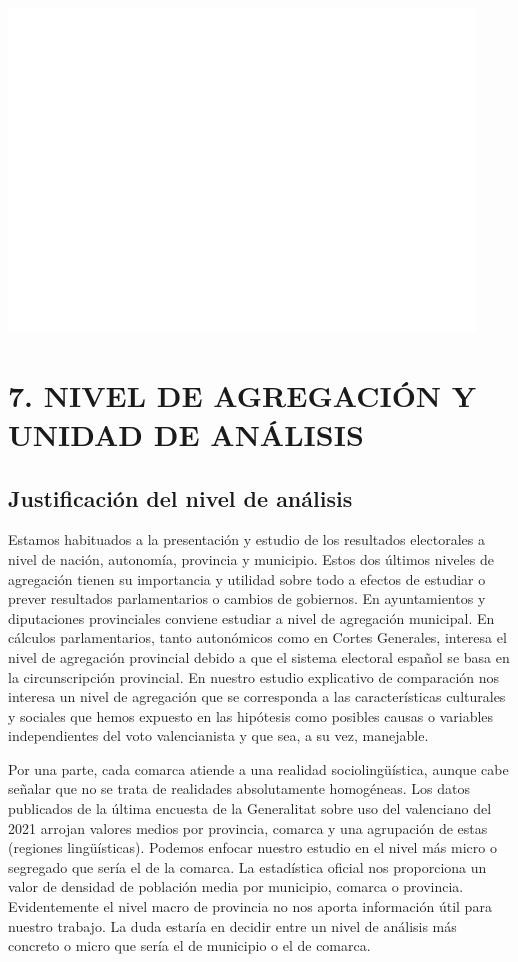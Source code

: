 \documentclass[
]{article}
\begin{document}
\includegraphics{votovalencianista-ea2023_files/figure-latex/especificacionesHipotesis4-1.png}

\hypertarget{nivel-de-agregaciuxf3n-y-unidad-de-anuxe1lisis}{%
\section{7. NIVEL DE AGREGACIÓN Y UNIDAD DE
ANÁLISIS}\label{nivel-de-agregaciuxf3n-y-unidad-de-anuxe1lisis}}

\hypertarget{justificaciuxf3n-del-nivel-de-anuxe1lisis}{%
\subsection{Justificación del nivel de
análisis}\label{justificaciuxf3n-del-nivel-de-anuxe1lisis}}

Estamos habituados a la presentación y estudio de los resultados
electorales a nivel de nación, autonomía, provincia y municipio. Estos
dos últimos niveles de agregación tienen su importancia y utilidad sobre
todo a efectos de estudiar o prever resultados parlamentarios o cambios
de gobiernos. En ayuntamientos y diputaciones provinciales conviene
estudiar a nivel de agregación municipal. En cálculos parlamentarios,
tanto autonómicos como en Cortes Generales, interesa el nivel de
agregación provincial debido a que el sistema electoral español se basa
en la circunscripción provincial. En nuestro estudio explicativo de
comparación nos interesa un nivel de agregación que se corresponda a las
características culturales y sociales que hemos expuesto en las
hipótesis como posibles causas o variables independientes del voto
valencianista y que sea, a su vez, manejable.

Por una parte, cada comarca atiende a una realidad sociolingüística,
aunque cabe señalar que no se trata de realidades absolutamente
homogéneas. Los datos publicados de la última encuesta de la Generalitat
sobre uso del valenciano del 2021 arrojan valores medios por provincia,
comarca y una agrupación de estas (regiones lingüísticas). Podemos
enfocar nuestro estudio en el nivel más micro o segregado que sería el
de la comarca. La estadística oficial nos proporciona un valor de
densidad de población media por municipio, comarca o provincia.
Evidentemente el nivel macro de provincia no nos aporta información útil
para nuestro trabajo. La duda estaría en decidir entre un nivel de
análisis más concreto o micro que sería el de municipio o el de comarca.
\end{document}
